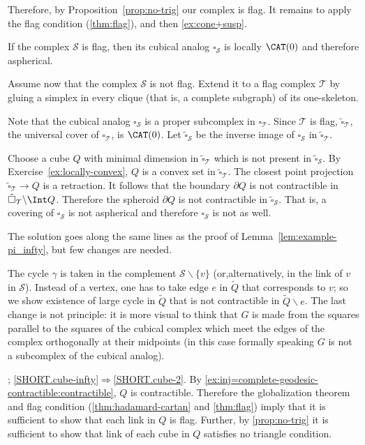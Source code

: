 Therefore, by Proposition~\ref{prop:no-trig} our complex is flag.
It remains to apply the flag condition (\ref{thm:flag}), and then \ref{ex:cone+susp}.

If the complex $\mathcal{S}$ is flag, then its cubical analog $\square_{\mathcal{S}}$ is locally $\CAT(0)$ and therefore aspherical.

Assume now that the complex $\mathcal{S}$ is not flag. 
Extend it to a flag complex $\mathcal{T}$ by gluing a simplex in every clique (that is, a complete subgraph) of its one-skeleton.

Note that the cubical analog $\square_{\mathcal{S}}$ is a proper subcomplex in $\square_{\mathcal{T}}$.
Since $\mathcal{T}$ is flag,
$\tilde\square_{\mathcal{T}}$,
the universal cover of $\square_{\mathcal{T}}$, is $\CAT(0)$.
Let $\tilde\square_{\mathcal{S}}$ be the inverse image of $\square_{\mathcal{S}}$ in $\tilde\square_{\mathcal{T}}$.

Choose a cube $Q$ with minimal dimension in $\tilde\square_{\mathcal{T}}$ which is not present in $\tilde\square_{\mathcal{S}}$.
By Exercise~\ref{ex:locally-convex}, $Q$ is a convex set in $\tilde\square_{\mathcal{T}}$.
The closest point projection $\tilde\square_{\mathcal{T}}\to Q$ is a retraction.
It follows that the boundary $\partial Q$ is not contractible in $\tilde\square_{\mathcal{T}}\backslash\Int Q$.
Therefore the spheroid $\partial Q$ is not contractible in $\tilde\square_{\mathcal{S}}$.
That is, a covering of $\square_{\mathcal{S}}$ is not aspherical and therefore $\square_{\mathcal{S}}$ is not as well.

The solution goes along the same lines as the proof of Lemma~\ref{lem:example-pi_infty}, but few changes are needed.

The cycle $\gamma$ is taken in the complement $\mathcal{S}\backslash\{v\}$ (or,alternatively, in the link of $v$ in $\mathcal{S}$).
Instead of a vertex, one has to take edge $e$ in $\tilde Q$ that corresponds to $v$; so we show existence of large cycle in $\tilde Q$ that is not contractible in $\tilde Q\backslash e$.
The last change is not principle:
it is more visual to think that $G$ is made from the squares parallel to the squares of the cubical complex which meet the edges of the complex orthogonally at their midpoints (in this case formally speaking $G$ is not a subcomplex of the cubical analog).

; \ref{SHORT.cube-infty}$\Rightarrow$\ref{SHORT.cube-2}.
By \ref{ex:inj=complete-geodesic-contractible:contractible}, $Q$ is contractible.
Therefore the globalization theorem and flag condition (\ref{thm:hadamard-cartan} and \ref{thm:flag}) imply that it is sufficient to show that each link in $Q$ is flag.
Further, by \ref{prop:no-trig} it is sufficient to show that link of each cube in $Q$ satisfies no triangle condition.

